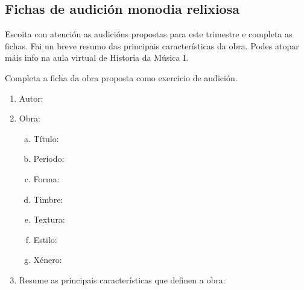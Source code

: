 \subsection*{Fichas de audición monodia relixiosa}
%
Escoita con atención as audicións propostas para este trimestre e completa as fichas. Fai un breve resumo das principais características da obra.
Podes atopar máis info na aula virtual de Historia da Música I.
%
\begin{multicols}{2}
%
%
\begin{ejercicio} 
%
Completa a ficha da obra proposta como exercicio de audición.
%
	\begin{enumerate}[1.-]
        \vspace*{0.3cm}
		\item
			Autor: \dotfill
			\vspace*{0.3cm}
		\item
			Obra:
			\begin{enumerate}[a)]
			    \item Título: \dotfill \vspace*{0.3cm}
			    \item Período: \dotfill \vspace*{0.3cm}
			    \item Forma: \dotfill \vspace*{0.3cm}
			    \item Timbre: \dotfill 			\vspace*{0.3cm}
			    \item Textura: \dotfill \vspace*{0.3cm}
			    \item Estilo: \dotfill \vspace*{0.3cm}
			    \item Xénero: \dotfill 
			    \vspace*{0.3cm}
			\end{enumerate}
		\item 
		    Resume as principais características que definen a obra:
			\vspace*{8.0cm}			


\end{enumerate}
\end{ejercicio}
\end{multicols}
